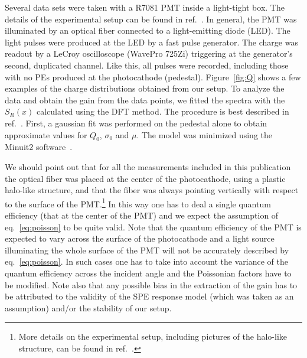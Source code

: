 \documentclass[a4paper,11pt]{article}
\begin{document}
Several data sets were taken with a R7081 PMT inside a light-tight box. 
The details of the experimental setup can be found in ref.~\cite{me}.
In general, the PMT was illuminated by an optical fiber connected to a light-emitting diode (LED).
The light pulses were produced at the LED by a fast pulse generator. 
The charge was readout by a LeCroy oscilloscope (WavePro 725Zi) triggering at the generator's second, duplicated channel. 
Like this, all pulses were recorded, including those with no PEs produced at the photocathode (pedestal). 
Figure~\ref{fig:Q} shows a few examples of the charge distributions obtained from our setup.  
To analyze the data and obtain the gain from the data points, we fitted the spectra with the $S_R(x)$ calculated using the DFT method.  
The procedure is best described in ref.~\cite{me}. 
First, a gaussian fit was performed on the pedestal alone to obtain approximate values for $Q_0$, $\sigma_0$ and $\mu$. 
The model was minimized using the Minuit2 software~\cite{Minuit2}. 




We should point out that for all the measurements included in this publication the optical fiber was placed at the center of the photocathode,
using a plastic halo-like structure, and that the fiber was always pointing vertically with respect to the surface of the PMT.\footnote{%
More details on the experimental setup, including pictures of the halo-like structure, can be found in ref.~\cite{thesis}.}
In this way one has to deal a single quantum efficiency (that at the center of the PMT) and we expect the assumption of eq.~\eqref{eq:poisson} to be quite valid. 
Note that the quantum efficiency of the PMT is expected to vary across the surface of the photocathode and a light source illuminating the whole surface of the PMT will not be 
accurately described by eq.~\eqref{eq:poisson}. In such cases one has to take into account the variance of the quantum efficiency across the incident angle and the Poissonian factors have to be modified. 
Note also that any possible bias in the extraction of the gain has to be attributed to the validity of the SPE response model (which was taken as an assumption)
and/or the stability of our setup. 
\end{document}
